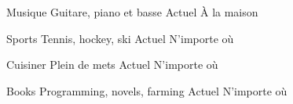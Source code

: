 \begin{cvhonors}
  \cvhonor
    {Musique} %
    {Guitare, piano et basse} %
    {Actuel} %
    {À la maison} %

  \cvhonor
    {Sports} %
    {Tennis, hockey, ski} %
    {Actuel} %
    {N'importe où} %

  \cvhonor
    {Cuisiner} %
    {Plein de mets} %
    {Actuel} %
    {N'importe où} %

  \cvhonor
    {Books} %
    {Programming, novels, farming} %
    {Actuel} %
    {N'importe où} %
\end{cvhonors}
